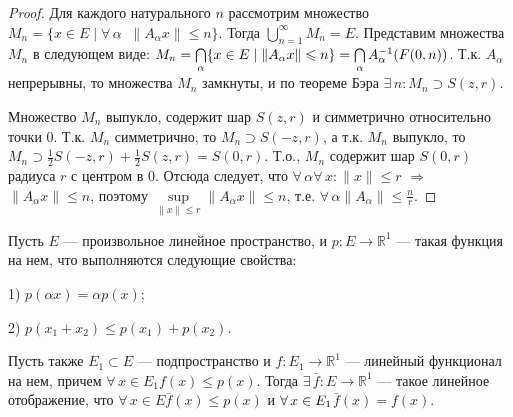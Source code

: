 \documentclass[10pt]{article}
\newcommand*{\p}[1]{#1\nobreak\discretionary{}{\hbox{$\mathsurround=0pt #1$}}{}}
\begin{document}
\begin{proof}
Для каждого натурального $n$ рассмотрим множество $M_n=\{x\in E\mid
\forall\,\alpha\;\;\|A_\alpha x\|\leqslant n\}$. Тогда
$\bigcup\limits_{n=1}^\infty M_n=E$. Представим множества $M_n$ в
следующем виде: $M_n=\bigcap\limits_\alpha \{x\in E\mid \|A_\alpha
x\|\leqslant n\}\p=\bigcap\limits_\alpha A^{-1}_\alpha(F(0,n))$.
Т.к. $A_\alpha$ непрерывны, то множества $M_n$ замкнуты, и по
теореме Бэра $\exists\,n:M_n\supset S(z,r)$.

Множество $M_n$ выпукло, содержит шар $S(z,r)$ и симметрично
относительно точки 0. Т.к. $M_n$ симметрично, то $M_n\supset
S(-z,r)$, а т.к. $M_n$ выпукло, то $M_n\supset \frac 1 2
S(-z,r)+\frac 1 2 S(z,r)=S(0,r)$. Т.о., $M_n$ содержит шар $S(0,r)$
радиуса $r$ с центром в 0. Отсюда следует, что
$\forall\,\alpha$\;\;$\forall\,x:\|x\|\leqslant r$ $\Rightarrow$
$\|A_\alpha x\|\leqslant n$, поэтому $\sup\limits_{\|x\|\leqslant
r}\|A_\alpha x\|\leqslant n$, т.е.
$\forall\,\alpha$\;\;$\|A_\alpha\|\leqslant \frac n r$.
\end{proof}


\begin{theorem}
Пусть $E$ --- произвольное линейное пространство, и $p\colon
E\to\mathbb{R}^1$
--- такая функция на нем, что выполняются следующие свойства:

1) $p(\alpha x)=\alpha p(x)$;

2) $p(x_1+x_2)\leqslant p(x_1)+p(x_2)$.

Пусть также $E_1\subset E$ --- подпространство и $f\colon
E_1\to\mathbb{R}^1$ --- линейный функционал на нем, причем
$\forall\,x\in E_1$\;\;$f(x)\leqslant p(x)$. Тогда
$\exists\,\bar{f}\colon E\to \mathbb{R}^1$ --- такое линейное
отображение, что $\forall\,x\in E$\;\;$\bar{f}(x)\leqslant p(x)$ и
$\forall\,x\p\in E_1$\;\;$\bar{f}(x)=f(x)$.
\end{theorem}
\end{document}
